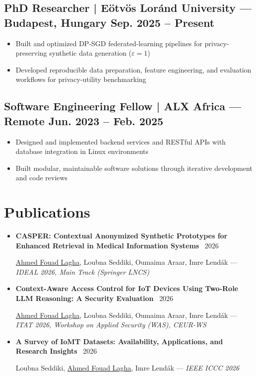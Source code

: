 \documentclass[10pt]{article}
\begin{document}
\subsection{PhD Researcher | \mdseries E\"otv\"os Lor\'and University --- Budapest, Hungary \hfill \bfseries Sep. 2025 -- Present}
\begin{itemize}
    \item Built and optimized DP-SGD federated-learning pipelines for privacy-preserving synthetic data generation ($\varepsilon=1$)
    \item Developed reproducible data preparation, feature engineering, and evaluation workflows for privacy-utility benchmarking
\end{itemize}

\subsection{Software Engineering Fellow | \mdseries ALX Africa --- Remote \hfill \bfseries Jun. 2023 -- Feb. 2025}
\begin{itemize}
    \item Designed and implemented backend services and RESTful APIs with database integration in Linux environments
    \item Built modular, maintainable software solutions through iterative development and code reviews
\end{itemize}

\section{Publications}
\begin{itemize}[itemsep=4pt]
    \item \textbf{CASPER: Contextual Anonymized Synthetic Prototypes for Enhanced Retrieval in Medical Information Systems} \,\href{https://doi.org/10.1007/978-3-032-45367-9_6}{} \href{https://github.com/ahmed-fouad-lagha/CASPER}{\faGithub} \hfill 2026 \par {\small \uline{Ahmed Fouad Lagha}, Loubna Seddiki, Oumaima Araar, Imre Lend\'ak --- \textit{IDEAL 2026, Main Track (Springer LNCS)}}
    \item \textbf{Context-Aware Access Control for IoT Devices Using Two-Role LLM Reasoning: A Security Evaluation} \,\href{https://ceur-ws.org/Vol-4323/paper36.pdf}{} \href{https://github.com/ahmed-fouad-lagha/IoT-Access-Sentinel}{\faGithub} \hfill 2026 \par {\small \uline{Ahmed Fouad Lagha}, Loubna Seddiki, Oumaima Araar, Imre Lend\'ak --- \textit{ITAT 2026, Workshop on Applied Security (WAS), CEUR-WS}}
    \item \textbf{A Survey of IoMT Datasets: Availability, Applications, and Research Insights} \,\href{https://doi.org/10.1109/ICCC68994.2026.11511640}{} \hfill 2026 \par {\small Loubna Seddiki, \uline{Ahmed Fouad Lagha}, Imre Lend\'ak --- \textit{IEEE ICCC 2026}}
\end{itemize}
\end{document}
